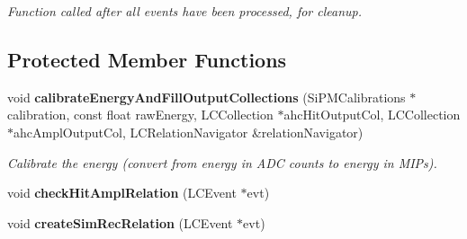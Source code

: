 \begin{DoxyCompactItemize}
\begin{DoxyCompactList}\small\item\em Function called after all events have been processed, for cleanup. \item\end{DoxyCompactList}\end{DoxyCompactItemize}
\subsection*{Protected Member Functions}
\begin{DoxyCompactItemize}
\item 
void {\bf calibrateEnergyAndFillOutputCollections} (SiPMCalibrations $\ast$calibration, const float rawEnergy, LCCollection $\ast$ahcHitOutputCol, LCCollection $\ast$ahcAmplOutputCol, LCRelationNavigator \&relationNavigator)
\begin{DoxyCompactList}\small\item\em Calibrate the energy (convert from energy in ADC counts to energy in MIPs). \item\end{DoxyCompactList}\item 
void {\bfseries checkHitAmplRelation} (LCEvent $\ast$evt)\label{classCALICE_1_1SiPMCalibrateProcessor_a0cab17864ce6d8d19c045a2f29d3f385}

\item 
void {\bfseries createSimRecRelation} (LCEvent $\ast$evt)\label{classCALICE_1_1SiPMCalibrateProcessor_aaac485a2a610b1a3170f3ae697df5e66}

\end{DoxyCompactItemize}
